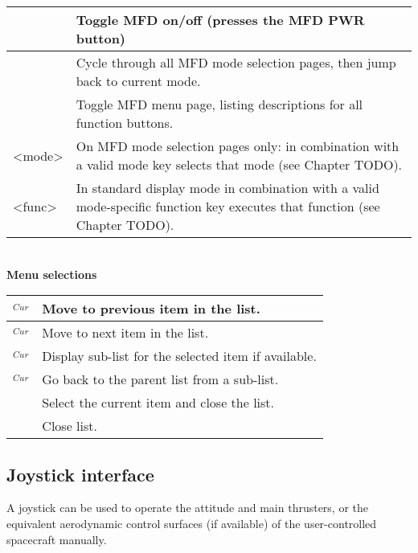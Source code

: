 \documentclass[Orbiter User Manual.tex]{subfiles}
\begin{document}
	\begin{longtable}{ |p{}|p{}| }
	\hline\rule{0pt}{2ex}
	\Shift\keystroke{Esc} & Toggle MFD on/off (presses the MFD PWR button)\\
	\hline\rule{0pt}{2ex}
	\Shift\keystroke{F1} & Cycle through all MFD mode selection pages, then jump back to current mode.\\
	\hline\rule{0pt}{2ex}
	\Shift\keystroke{'} & Toggle MFD menu page, listing descriptions for all function buttons.\\
	\hline\rule{0pt}{2ex}
	\Shift<mode> & On MFD mode selection pages only: \Shift in combination with a valid mode key selects that mode (see Chapter TODO).\\
	\hline\rule{0pt}{2ex}
	\Shift<func> & In standard display mode \Shift in combination with a valid mode-specific function key executes that function (see Chapter TODO).\\
	\hline
	\end{longtable}

\noindent
\\
\textbf{Menu selections}

	\begin{longtable}{ |p{}|p{}| }
	\hline\rule{0pt}{2ex}
	\UArrow$_{Cur}$ & Move to previous item in the list.\\
	\hline\rule{0pt}{2ex}
	\DArrow$_{Cur}$ & Move to next item in the list.\\
	\hline\rule{0pt}{2ex}
	\RArrow$_{Cur}$ & Display sub-list for the selected item if available.\\
	\hline\rule{0pt}{2ex}
	\LArrow$_{Cur}$ & Go back to the parent list from a sub-list.\\
	\hline\rule{0pt}{2ex}
	\Enter & Select the current item and close the list.\\
	\hline\rule{0pt}{2ex}
	\keystroke{Esc} & Close list.\\
	\hline
	\end{longtable}


\subsection{Joystick interface}
A joystick can be used to operate the attitude and main thrusters, or the equivalent aerodynamic control surfaces (if available) of the user-controlled spacecraft manually.
\end{document}
